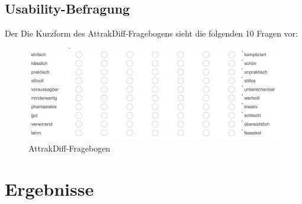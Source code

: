 \subsection{Usability-Befragung}
Der Die Kurzform des AttrakDiff-Fragebogens sieht die folgenden 10 Fragen vor:
\begin{figure}[H]
 \centering
 \includegraphics[width=1\textwidth]{grafiken/attrak_diff_short.png}
 \caption{AttrakDiff-Fragebogen}
 \label{fig:attrakDiffFragebogen}
\end{figure}
\section{Ergebnisse}
